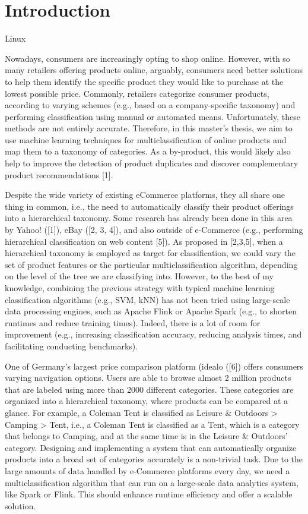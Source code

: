 \chapter{Introduction\label{cha:intro}}
\gls{Linux}

Nowadays, consumers are increasingly opting to shop online. However, with so many retailers offering products online, arguably, consumers need better solutions to help them identify the specific product they would like to purchase at the lowest possible price. Commonly, retailers categorize consumer products, according to varying schemes (e.g., based on a company-specific taxonomy) and performing classification using manual or automated means. Unfortunately, these methods are not entirely accurate. Therefore, in this master's thesis, we aim to use machine learning techniques for multiclassification of online products and map them to a taxonomy of categories. As a by-product, this would likely also help to improve the detection of product duplicates and discover complementary product recommendations [1]. 

Despite the wide variety of existing eCommerce platforms, they all share one thing in common, i.e., the need to automatically classify their product offerings into a hierarchical taxonomy. Some research has already been done in this area by Yahoo! ([1]), eBay ([2, 3, 4]), and also outside of e-Commerce (e.g., performing hierarchical classification on web content [5]). As proposed in [2,3,5], when a hierarchical taxonomy is employed as target for classification, we could vary the set of product features or the particular multiclassification algorithm, depending on the level of the tree we are classifying into. However, to the best of my knowledge, combining the previous strategy with typical machine learning classification algorithms (e.g., SVM, kNN) has not been tried using large-scale data processing engines, such as Apache Flink or Apache Spark (e.g., to shorten runtimes and reduce training times). Indeed, there is a lot of room for improvement (e.g., increasing classification accuracy, reducing analysis times, and facilitating conducting benchmarks).

One of Germany's largest price comparison platform (idealo ([6]) offers consumers varying navigation options. Users are able to browse almost 2 million products that are labeled using more than 2000 different categories. These categories are organized into a hierarchical taxonomy, where products can be compared at a glance. For example, a Coleman Tent is classified as Leisure \& Outdoors > Camping > Tent, i.e., a Coleman Tent is classified as a Tent, which is a category that belongs to Camping, and at the same time is in the Leisure \& Outdoors’ category. Designing and implementing a system that can automatically organize products into a broad set of categories accurately is a non-trivial task.
Due to the large amounts of data handled by e-Commerce platforms every day, we need a multiclassification algorithm that can run on a large-scale data analytics system, like Spark or Flink. This should enhance runtime efficiency and offer a scalable solution. 



